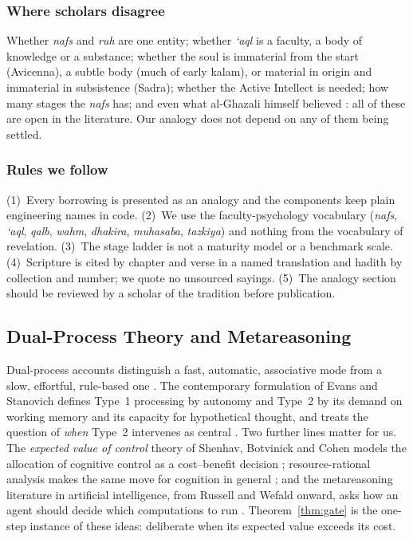 \subsubsection{Where scholars disagree}
Whether \emph{nafs} and \emph{ruh} are one entity; whether
\emph{\textquoteleft aql} is a faculty, a body of knowledge or a substance;
whether the soul is immaterial from the start (Avicenna), a subtle body (much
of early kalam), or material in origin and immaterial in subsistence (Sadra);
whether the Active Intellect is needed; how many stages the \emph{nafs} has;
and even what al-Ghazali himself believed
\cite{Gianotti2001,Treiger2011,Griffel2009}: all of these are open in the
literature. Our analogy does not depend on any of them being settled.

\subsubsection{Rules we follow}
(1)~Every borrowing is presented as an analogy and the components keep plain
engineering names in code. (2)~We use the faculty-psychology vocabulary
(\emph{nafs}, \emph{\textquoteleft aql}, \emph{qalb}, \emph{wahm},
\emph{dhakira}, \emph{muhasaba}, \emph{tazkiya}) and nothing from the
vocabulary of revelation. (3)~The stage ladder is not a maturity model or a
benchmark scale. (4)~Scripture is cited by chapter and verse in a named
translation and hadith by collection and number; we quote no unsourced
sayings. (5)~The analogy section should be reviewed by a scholar of the
tradition before publication.

\subsection{Dual-Process Theory and Metareasoning}
\label{sec:dualprocess}
Dual-process accounts distinguish a fast, automatic, associative mode from a
slow, effortful, rule-based one
\cite{sloman1996two,stanovich2000individual,kahneman2011thinking}. The
contemporary formulation of Evans and Stanovich defines Type~1 processing by
autonomy and Type~2 by its demand on working memory and its capacity for
hypothetical thought, and treats the question of \emph{when} Type~2 intervenes
as central \cite{evans2013dual}. Two further lines matter for us. The
\emph{expected value of control} theory of Shenhav, Botvinick and Cohen models
the allocation of cognitive control as a cost--benefit decision
\cite{shenhav2013evc}; resource-rational analysis makes the same move for
cognition in general \cite{lieder2020resource}; and the metareasoning
literature in artificial intelligence, from Russell and Wefald onward, asks how
an agent should decide which computations to run \cite{russell1991metareasoning}.
Theorem~\ref{thm:gate} is the one-step instance of these ideas: deliberate
when its expected value exceeds its cost.

